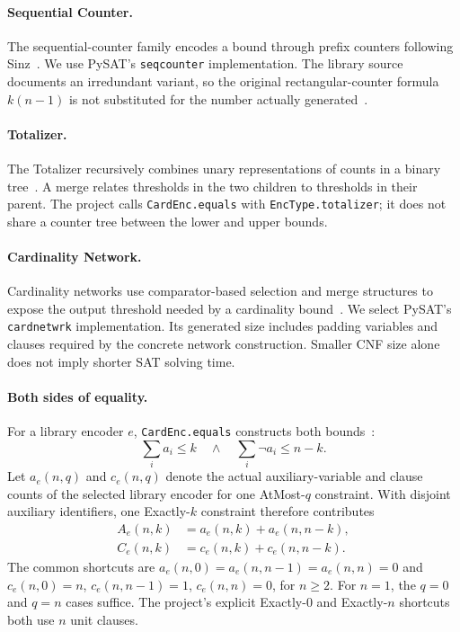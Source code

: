 \documentclass[a4paper,fleqn]{cas-sc}
\begin{document}
\paragraph{Sequential Counter.}
The sequential-counter family encodes a bound through prefix counters
following Sinz~\cite{sinz2005towards}. We use PySAT's \texttt{seqcounter}
implementation. The library source documents an irredundant variant,
so the original rectangular-counter formula $k(n-1)$ is not substituted
for the number actually generated~\cite{pysat-seqcounter-source}.

\paragraph{Totalizer.}
The Totalizer recursively combines unary representations of counts in a
binary tree~\cite{bailleux2003totalizer}. A merge relates thresholds in the two
children to thresholds in their parent. The project calls
\texttt{CardEnc.equals} with \texttt{EncType.totalizer}; it does not
share a counter tree between the lower and upper bounds.

\paragraph{Cardinality Network.}
Cardinality networks use comparator-based selection and merge structures
to expose the output threshold needed by a cardinality
bound~\cite{asin2009cardnet}. We select PySAT's \texttt{cardnetwrk} implementation.
Its generated size includes padding variables and clauses required by
the concrete network construction. Smaller CNF size alone does not imply
shorter SAT solving time.

\paragraph{Both sides of equality.}
For a library encoder $e$, \texttt{CardEnc.equals}
constructs both bounds~\cite{pysat-card-docs}:
\begin{equation}
 \sum_i a_i\leq k
 \quad\land\quad
 \sum_i \neg a_i\leq n-k.
 \label{eq:equals-two-bounds}
\end{equation}
Let $a_e(n,q)$ and $c_e(n,q)$ denote the actual auxiliary-variable and
clause counts of the selected library encoder for one AtMost-$q$
constraint. With disjoint auxiliary identifiers, one Exactly-$k$
constraint therefore contributes
\begin{align}
 A_e(n,k)&=a_e(n,k)+a_e(n,n-k),
 \label{eq:equals-aux-count}\\
 C_e(n,k)&=c_e(n,k)+c_e(n,n-k).
 \label{eq:equals-clause-count}
\end{align}
The common shortcuts are $a_e(n,0)=a_e(n,n-1)=a_e(n,n)=0$ and
$c_e(n,0)=n$, $c_e(n,n-1)=1$, $c_e(n,n)=0$, for $n\geq2$.
For $n=1$, the $q=0$ and $q=n$ cases suffice. The project's explicit
Exactly-$0$ and Exactly-$n$ shortcuts both use $n$ unit clauses.
\end{document}
